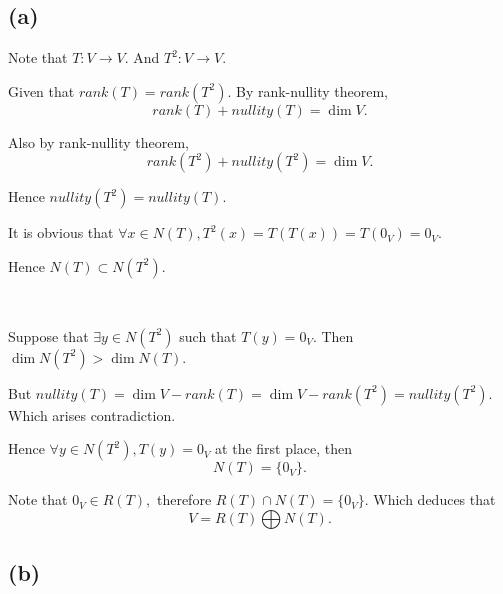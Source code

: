 \documentclass[12pt]{article}%
\begin{document}
\subsection{(a)}

Note that $T:V \to V.$ And $T^2:V \to V.$

Given that $rank(T)=rank(T^2).$ By rank-nullity theorem, $$rank(T)+nullity(T)=\dim{V}.$$

Also by rank-nullity theorem, $$rank(T^2)+nullity(T^2)=\dim{V}.$$

Hence $nullity(T^2)=nullity(T).$

It is obvious that $\forall x\in N(T),T^2(x)=T(T(x))=T(0_V)=0_V.$

Hence $N(T) \subset N(T^2).$

~\ 

Suppose that $\exists y \in N(T^2)$ such that $T(y)=0_V.$ Then $\dim{N(T^2)}>\dim{N(T)}.$

But $nullity(T)=\dim{V}-rank(T)=\dim{V}-rank(T^2)=nullity(T^2).$ Which arises contradiction.

Hence $\forall y \in N(T^2), T(y)=0_V$ at the first place, then $$N(T)=\{0_V\}.$$

Note that $0_V \in R(T),$ therefore $R(T) \cap N(T)=\{0_V\}.$ Which deduces that $$V=R(T)\bigoplus
N(T).$$

\subsection{(b)}
\end{document}
